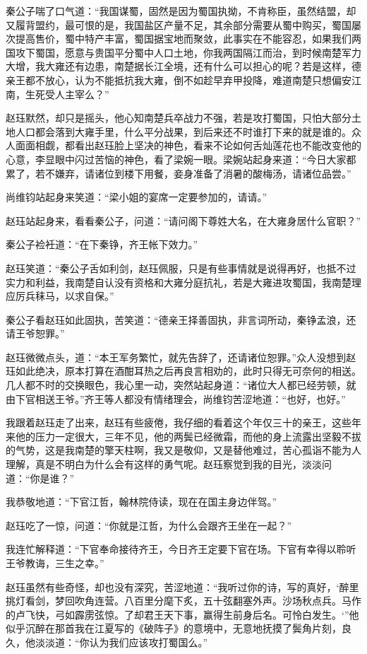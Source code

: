 秦公子喘了口气道：“我国谋蜀，固然是因为蜀国执拗，不肯称臣，虽然结盟，却又履背盟约，最可恨的是，我国盐区产量不足，其余部分需要从蜀中购买，蜀国屡次提高售价，蜀中特产丰富，蜀国据宝地而聚敛，此事实在不能容忍，如果我们两国攻下蜀国，愿意与贵国平分蜀中人口土地，你我两国隔江而治，到时候南楚军力大增，我大雍还有边患，南楚据长江全境，还有什么可以担心的呢？若是这样，德亲王都不放心，认为不能抵抗我大雍，倒不如趁早弃甲投降，难道南楚只想偏安江南，生死受人主宰么？”

赵珏默然，却只是摇头，他心知南楚兵卒战力不强，若是攻打蜀国，只怕大部分土地人口都会落到大雍手里，什么平分战果，到后来还不时谁打下来的就是谁的。众人面面相觑，都看出赵珏脸上坚决的神色，看来不论如何舌灿莲花也不能改变他的心意，李显眼中闪过苦恼的神色，看了梁婉一眼。梁婉站起身来道：“今日大家都累了，若不嫌弃，请诸位到楼下用餐，妾身准备了消暑的酸梅汤，请诸位品尝。”

尚维钧站起身来笑道：“梁小姐的宴席一定要参加的，请请。”

赵珏站起身来，看看秦公子，问道：“请问阁下尊姓大名，在大雍身居什么官职？”

秦公子裣衽道：“在下秦铮，齐王帐下效力。”

赵珏笑道：“秦公子舌如利剑，赵珏佩服，只是有些事情就是说得再好，也抵不过实力和利益，我南楚自认没有资格和大雍分庭抗礼，若是大雍进攻蜀国，我南楚理应厉兵秣马，以求自保。”

秦公子看赵珏如此固执，苦笑道：“德亲王择善固执，非言词所动，秦铮孟浪，还请王爷恕罪。”

赵珏微微点头，道：“本王军务繁忙，就先告辞了，还请诸位恕罪。”众人没想到赵珏如此绝决，原本打算在酒酣耳热之后再良言相劝的，此时只得无可奈何的相送。几人都不时的交换眼色，我心里一动，突然站起身道：“诸位大人都已经劳顿，就由下官相送王爷。”齐王等人都没有情绪理会，尚维钧苦涩地道：“也好，也好。”

我跟着赵珏走了出来，赵珏有些疲倦，我仔细的看着这个年仅三十的亲王，这些年来他的压力一定很大，三年不见，他的两鬓已经微霜，而他的身上流露出坚毅不拔的气势，这是我南楚的擎天柱啊，我又是敬仰，又是替他难过，苦心孤诣不能为人理解，真是不明白为什么会有这样的勇气呢。赵珏察觉到我的目光，淡淡问道：“你是谁？”

我恭敬地道：“下官江哲，翰林院侍读，现在在国主身边伴驾。”

赵珏吃了一惊，问道：“你就是江哲，为什么会跟齐王坐在一起？”

我连忙解释道：“下官奉命接待齐王，今日齐王定要下官在场。下官有幸得以聆听王爷教诲，三生之幸。”

赵珏虽然有些奇怪，却也没有深究，苦涩地道：“我听过你的诗，写的真好，‘醉里挑灯看剑，梦回吹角连营。八百里分麾下炙，五十弦翻塞外声。沙场秋点兵。马作的卢飞快，弓如霹雳弦惊。了却君王天下事，赢得生前身后名。可怜白发生。‘”他似乎沉醉在那首我在江夏写的《破阵子》的意境中，无意地抚摸了鬓角片刻，良久，他淡淡道：“你认为我们应该攻打蜀国么。”

